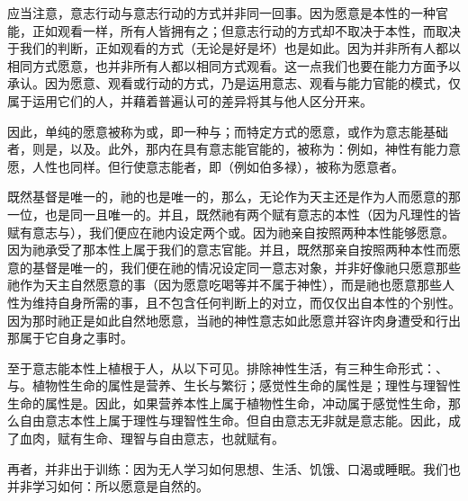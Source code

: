 应当注意，意志行动与意志行动的方式并非同一回事。因为愿意是本性的一种官能，正如观看一样，所有人皆拥有之；但意志行动的方式却不取决于本性，而取决于我们的判断，正如观看的方式（无论是好是坏）也是如此。因为并非所有人都以相同方式愿意，也并非所有人都以相同方式观看。这一点我们也要在能力方面予以承认。因为愿意、观看或行动的方式，乃是运用意志、观看与能力官能的模式，仅属于运用它们的人，并藉着普遍认可的差异将其与他人区分开来。\par

因此，单纯的愿意被称为或，即一种与；而特定方式的愿意，或作为意志能基础者，则是，以及。此外，那内在具有意志能官能的，被称为：例如，神性有能力意愿，人性也同样。但行使意志能者，即（例如伯多禄），被称为愿意者。\par

既然基督是唯一的，祂的也是唯一的，那么，无论作为天主还是作为人而愿意的那一位，也是同一且唯一的。并且，既然祂有两个赋有意志的本性（因为凡理性的皆赋有意志与），我们便应在祂内设定两个或。因为祂亲自按照两种本性能够愿意。因为祂承受了那本性上属于我们的意志官能。并且，既然那亲自按照两种本性而愿意的基督是唯一的，我们便在祂的情况设定同一意志对象，并非好像祂只愿意那些祂作为天主自然愿意的事（因为愿意吃喝等并不属于神性），而是祂也愿意那些人性为维持自身所需的事，且不包含任何判断上的对立，而仅仅出自本性的个别性。因为那时祂正是如此自然地愿意，当祂的神性意志如此愿意并容许肉身遭受和行出那属于它自身之事时。\par

至于意志能本性上植根于人，从以下可见。排除神性生活，有三种生命形式：、与。植物性生命的属性是营养、生长与繁衍；感觉性生命的属性是；理性与理智性生命的属性是。因此，如果营养本性上属于植物性生命，冲动属于感觉性生命，那么自由意志本性上属于理性与理智性生命。但自由意志无非就是意志能。因此，成了血肉，赋有生命、理智与自由意志，也就赋有。\par

再者，并非出于训练：因为无人学习如何思想、生活、饥饿、口渴或睡眠。我们也并非学习如何：所以愿意是自然的。\par

